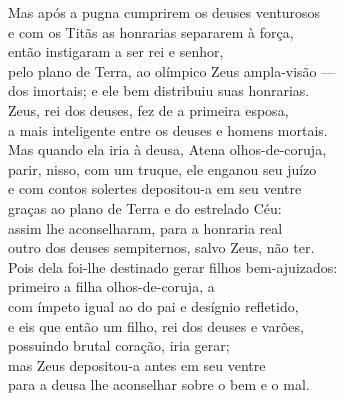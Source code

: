 \begin{pages}
\begin{Rightside}
\smallskip
\begin{center}\end{center}
\smallskip

Mas após a pugna cumprirem os deuses venturosos\\
e com os Titãs as honrarias separarem à força,\\
então instigaram a ser rei e senhor,\\
pelo plano de Terra, ao olímpico Zeus ampla-visão ---\\
dos imortais; e ele bem distribuiu suas honrarias.\\

\quad{}Zeus, rei dos deuses, fez de  a primeira esposa,\\
a mais inteligente entre os deuses e homens mortais.\\
Mas quando ela iria à deusa, Atena olhos-de-coruja,\\
parir, nisso, com um truque, ele enganou seu juízo\\
e com contos solertes depositou-a em seu ventre \\
graças ao plano de Terra e do estrelado Céu:\\
assim lhe aconselharam, para a honraria real\\
outro dos deuses sempiternos, salvo Zeus, não ter.\\
Pois dela foi-lhe destinado gerar filhos bem-ajuizados:\\
primeiro a filha olhos-de-coruja, a  \\
com ímpeto igual ao do pai e desígnio refletido,\\
e eis que então um filho, rei dos deuses e varões,\\
possuindo brutal coração, iria gerar;\\
mas Zeus depositou-a antes em seu ventre\\
para a deusa lhe aconselhar sobre o bem e o mal. \\


\end{Rightside}
\end{pages}
